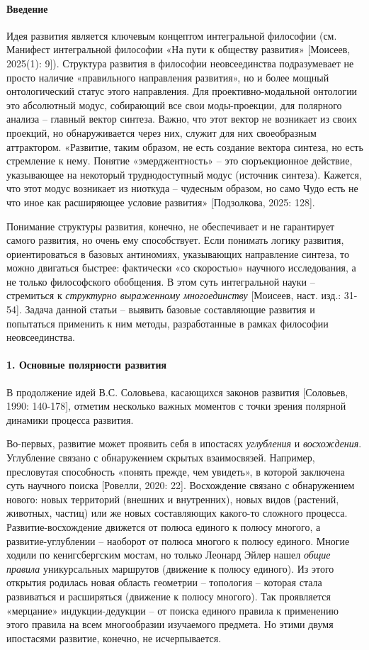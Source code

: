     \paragraph*{Введение}
    Идея развития является ключевым концептом интегральной философии (см. Манифест интегральной философии «На пути к обществу развития» [Моисеев, 2025(1): 9]). Структура развития в философии неовсеединства подразумевает не просто наличие «правильного направления развития», но и более мощный онтологический статус этого направления. Для проективно-модальной онтологии это абсолютный модус, собирающий все свои моды-проекции, для полярного анализа – главный вектор синтеза. Важно, что этот вектор не возникает из своих проекций, но обнаруживается через них, служит для них своеобразным аттрактором. «Развитие, таким образом, не есть создание вектора синтеза, но есть стремление к нему. Понятие «эмерджентность» – это сюръекционное действие, указывающее на некоторый труднодоступный модус (источник синтеза). Кажется, что этот модус возникает из ниоткуда – чудесным образом, но само Чудо есть не что иное как расширяющее условие развития» [Подзолкова, 2025: 128].

    Понимание структуры развития, конечно, не обеспечивает и не гарантирует самого развития, но очень ему способствует. Если понимать логику развития, ориентироваться в базовых антиномиях, указывающих направление синтеза, то можно двигаться быстрее: фактически «со скоростью» научного исследования, а не только философского обобщения. В этом суть интегральной науки – стремиться к \textit{структурно выраженному многоединству} [Моисеев, наст. изд.: 31-54]. Задача данной статьи – выявить базовые составляющие развития и попытаться применить к ним методы, разработанные в рамках философии неовсеединства.

    \paragraph*{1. Основные полярности развития}
    В продолжение идей В.С. Соловьева, касающихся законов развития [Соловьев, 1990: 140-178], отметим несколько важных моментов с точки зрения полярной динамики процесса развития.

    Во-первых, развитие может проявить себя в ипостасях \textit{углубления} и \textit{восхождения}. Углубление связано с обнаружением скрытых взаимосвязей. Например, пресловутая способность «понять прежде, чем увидеть», в которой заключена суть научного поиска [Ровелли, 2020: 22]. Восхождение связано с обнаружением нового: новых территорий (внешних и внутренних), новых видов (растений, животных, частиц) или же новых составляющих какого-то сложного процесса. Развитие-восхождение движется от полюса единого к полюсу многого, а развитие-углублении – наоборот от полюса многого к полюсу единого. Многие ходили по кенигсбергским мостам, но только Леонард Эйлер нашел \textit{общие правила} уникурсальных маршрутов (движение к полюсу единого). Из этого открытия родилась новая область геометрии – топология – которая стала развиваться и расширяться (движение к полюсу многого). Так проявляется «мерцание» индукции-дедукции – от поиска единого правила к применению этого правила на всем многообразии изучаемого предмета. Но этими двумя ипостасями развитие, конечно, не исчерпывается.

